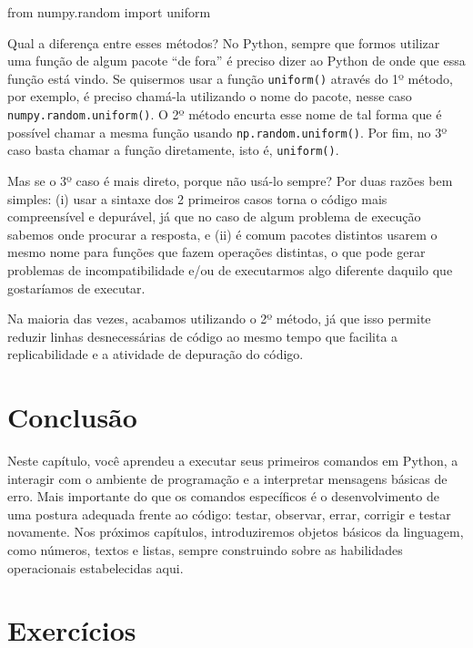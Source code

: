 \documentclass[
  brazilian,
  letterpaper,
  DIV=11,
  numbers=noendperiod]{scrreprt}
\newenvironment{Shaded}{\begin{snugshade}}{\end{snugshade}}
\newcommand{\ImportTok}[1]{\textcolor[rgb]{0.00,0.46,0.62}{#1}}
\newcommand{\NormalTok}[1]{\textcolor[rgb]{0.00,0.23,0.31}{#1}}
\begin{document}
\begin{Shaded}
\begin{Highlighting}[]
\ImportTok{from}\NormalTok{ numpy.random }\ImportTok{import}\NormalTok{ uniform}
\end{Highlighting}
\end{Shaded}

Qual a diferença entre esses métodos? No Python, sempre que formos
utilizar uma função de algum pacote ``de fora'' é preciso dizer ao
Python de onde que essa função está vindo. Se quisermos usar a função
\texttt{uniform()} através do 1º método, por exemplo, é preciso chamá-la
utilizando o nome do pacote, nesse caso \texttt{numpy.random.uniform()}.
O 2º método encurta esse nome de tal forma que é possível chamar a mesma
função usando \texttt{np.random.uniform()}. Por fim, no 3º caso basta
chamar a função diretamente, isto é, \texttt{uniform()}.

Mas se o 3º caso é mais direto, porque não usá-lo sempre? Por duas
razões bem simples: (i) usar a sintaxe dos 2 primeiros casos torna o
código mais compreensível e depurável, já que no caso de algum problema
de execução sabemos onde procurar a resposta, e (ii) é comum pacotes
distintos usarem o mesmo nome para funções que fazem operações
distintas, o que pode gerar problemas de incompatibilidade e/ou de
executarmos algo diferente daquilo que gostaríamos de executar.

Na maioria das vezes, acabamos utilizando o 2º método, já que isso
permite reduzir linhas desnecessárias de código ao mesmo tempo que
facilita a replicabilidade e a atividade de depuração do código.

\section{Conclusão}\label{conclusuxe3o-1}

Neste capítulo, você aprendeu a executar seus primeiros comandos em
Python, a interagir com o ambiente de programação e a interpretar
mensagens básicas de erro. Mais importante do que os comandos
específicos é o desenvolvimento de uma postura adequada frente ao
código: testar, observar, errar, corrigir e testar novamente. Nos
próximos capítulos, introduziremos objetos básicos da linguagem, como
números, textos e listas, sempre construindo sobre as habilidades
operacionais estabelecidas aqui.

\section{Exercícios}\label{exercuxedcios-1}
\end{document}
